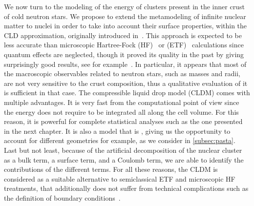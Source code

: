 We now turn to the modeling of the energy of clusters present in the inner crust
of cold neutron stars. We propose to extend the metamodeling of infinite nuclear 
matter to nuclei in order to take into account their surface properties, within 
the CLD approximation, originally
introduced in~\cite{BBP}. This approach is 
expected to be less accurate than microscopic Hartree-Fock
(HF)~\cite{Negele1973} or (ETF)~\cite{Onsi2008} 
calculations since quantum effects are neglected, 
though it proved its quality in the past by giving surprisingly good
results, see for example~\cite{BBP,Lattimer1991,Douchin2000a,Douchin2001}. 
In particular, it
appears that most of the macroscopic observables related to neutron stars, such 
as masses and radii, are not very sensitive to the crust composition, thus a 
qualitative evaluation of it is sufficient in that case.
The compressible liquid drop model (CLDM) comes with multiple advantages. It is
very fast from the computational point of view since the energy does not require
to be integrated all along the cell volume.
For this reason, it is powerful for complete statistical analyses such as the one 
presented in the next chapter. It is also a model that is , giving 
us the opportunity to account for different geometries for example, as we 
consider in \ref{subsec:pasta}. Last but not 
least, because of the artificial decomposition of the nuclear cluster as a 
bulk term, a surface term, and a Coulomb term, we are able to identify the
contributions of the different terms. For all these reasons, the CLDM is
considered as a suitable alternative to semiclassical ETF and microscopic 
HF treatments, that additionally does not suffer from technical
complications such as the definition of boundary conditions~\cite{Newton2009}.


